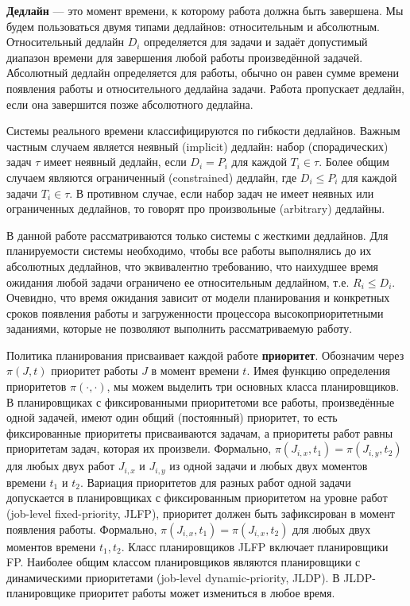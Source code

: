 \textbf{Дедлайн} --- это момент времени, к которому работа должна быть завершена. Мы
  будем пользоваться двумя типами дедлайнов: относительным и абсолютным. Относительный
  дедлайн $D_i$ определяется для задачи и задаёт допустимый
  диапазон времени для завершения любой работы произведённой задачей. Абсолютный дедлайн определяется
  для работы, обычно он равен сумме времени появления работы и относительного дедлайна задачи.
  Работа пропускает дедлайн, если она завершится позже абсолютного дедлайна.

Системы реального времени классифицируются по гибкости дедлайнов. Важным частным случаем
  является неявный (implicit) дедлайн: набор (спорадических) задач
  $\tau$ имеет неявный дедлайн, если $D_i = P_i$ для каждой $T_i \in \tau$. Более
  общим случаем являются ограниченный (constrained) дедлайн, где $D_i \leq P_i$
  для каждой задачи $T_i \in \tau$. В противном случае, если набор задач не имеет неявных
  или ограниченных дедлайнов, то говорят про произвольные (arbitrary) дедлайны.

В данной работе рассматриваются только системы с жесткими дедлайнов. Для планируемости
  системы необходимо, чтобы все работы выполнялись до их абсолютных дедлайнов, что
  эквивалентно требованию, что наихудшее время ожидания любой задачи ограничено ее
  относительным дедлайном, т.е. $R_i \leq D_i$. Очевидно, что время ожидания зависит
  от модели планирования и конкретных сроков появления работы и
  загруженности процессора высокоприоритетными заданиями, которые не позволяют
  выполнить рассматриваемую работу.

Политика планирования присваивает каждой работе \textbf{приоритет}. Обозначим через
  $\pi (J, t) $ приоритет работы $J$ в момент времени $t$. Имея функцию определения
  приоритетов $\pi(\cdotp, \cdotp)$, мы можем выделить три основных класса планировщиков.
  В планировщиках с фиксированными приоритетоми все работы, произведённые одной задачей,
  имеют один общий (постоянный) приоритет, то есть фиксированные приоритеты присваиваются
  задачам, а приоритеты работ равны приоритетам задач, которая их произвели.
  Формально, $\pi(J_{i, x}, t_1) = \pi (J_{i, y}, t_2)$ для любых двух работ $J_{i, x}$
  и $J_{i, y}$ из одной задачи и любых двух моментов времени $t_1$ и $t_2$. Вариация
  приоритетов для разных работ одной задачи допускается в планировщиках с фиксированным
  приоритетом на уровне работ (job-level fixed-priority, JLFP), приоритет должен
  быть зафиксирован в момент появления работы.  Формально, $\pi (J_{i, x}, t_1) = \pi (J_{i, x}, t_2)$
  для любых двух моментов времени $t_1, t_2$. Класс планировщиков JLFP включает
  планировщики FP. Наиболее общим классом планировщиков являются планировщики с
  динамическими приоритетами (job-level dynamic-priority, JLDP). В JLDP-планировщике
  приоритет работы может измениться в любое время.

